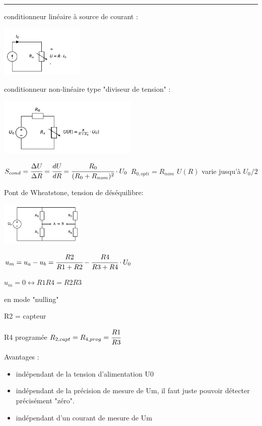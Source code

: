 \documentclass[	DIV=calc,%
							paper=a4,%
							fontsize=11pt,%
							twocolumn]{scrartcl} %
\newcommand{\hformbar}[1]{\bigskip\hrule\vspace{5pt}} %
\newcounter{mycounter}
\newcommand{\formdesc}[1]{\noindent\textbf{#1} \addtocounter{mycounter}{1} \hfill \themycounter}
\begin{document}
\hformbar

\formdesc{Conditionneurs pour capteur résistif}

conditionneur linéaire à source de courant :

\includegraphics[width = 0.3\textwidth,center]{img/condi_cur.pdf}

conditionneur non-linéaire type "diviseur de tension" :

\includegraphics[width = 0.5\textwidth,center]{img/condi_ten.pdf}

$S_{cond} = \cfrac{\Delta U }{\Delta R } = \cfrac{d U }{d R } = \cfrac{R_0 }{(R_0 + R_{nom})^2}\cdot U_0$
$R_{0,opti} = R_{nom}$
$U(R)$ varie jusqu'à $U_0/2$

Pont de Wheatstone, tension de déséquilibre:

\includegraphics[width = 0.3\textwidth,center]{img/wheastone.pdf}

$u_m = u_a-u_b = \cfrac{R2}{R1+R2}-\cfrac{R4}{R3+R4} \cdot U_0$

$u_m = 0 \leftrightarrow R1R4=R2R3$

en mode "nulling"

R2 = capteur

R4 programée $R_{2,capt} = R_{4,prog} = \cfrac{R1}{R3}$

Avantages :

\begin{itemize}
    \item indépendant de la tension d'alimentation U0
    \item indépendant de la précision de mesure de Um, il faut juste pouvoir détecter précisément "zéro".
    \item indépendant d'un courant de mesure de Um
\end{itemize}
\end{document}
